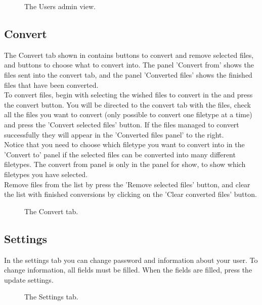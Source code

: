  \begin{figure}[h!]
 \caption{The Users admin view.}
 \label{fig:des_users}
 \end{figure}


\subsection{Convert}

The Convert tab shown in  contains buttons to convert and remove selected files, and buttons to choose what to convert into. The panel 'Convert from' shows the files sent into the convert tab, and the panel 'Converted files' shows the finished files that have been converted. \\

To convert files, begin with selecting the wished files to convert in the  and press the convert button. You will be directed to the convert tab with the files, check all the files you want to convert (only possible to convert one filetype at a time) and press the 'Convert selected files' button. If the files managed to convert successfully they will appear in the 'Converted files panel' to the right. \\

Notice that you need to choose which filetype you want to convert into in the 'Convert to' panel if the selected files can be converted into many different filetypes. The convert from panel is only in the panel for show, to show which filetypes you have selected. \\

Remove files from the list by press the 'Remove selected files' button, and clear the list with finished conversions by clicking on the 'Clear converted files' button.


 \begin{figure}[h!]
 \caption{The Convert tab.}
 \label{fig:des_convert}
 \end{figure}

\subsection{Settings}

In the settings tab  you can change password and information about your user. To change information, all fields must be filled. When the fields are filled, press the update settings.

 \begin{figure}[h!]
 \caption{The Settings tab.}
 \label{fig:des_settings}
 \end{figure}

